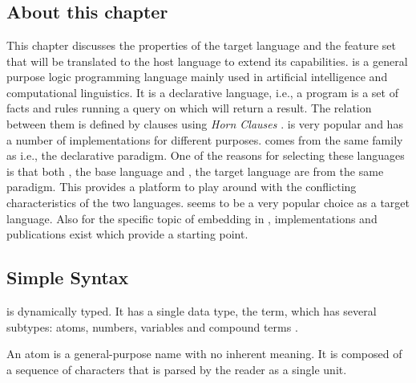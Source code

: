 \documentclass[thesis-solanki.tex]{subfiles}
\begin{document}
\chapter{}\label{chap:pwp}


\section{About this chapter}

This chapter discusses the properties of the target language  and the feature set that will be
translated to the host language to extend its capabilities.
 is a general purpose logic programming language mainly used in artificial intelligence and
computational linguistics.
It is a declarative language, i.e., a program is a set of facts and rules running a query on which will return a
result.
The relation between them is defined by clauses using \textit{Horn Clauses} \cite{wikiprolog}.
 is very popular and has a number of implementations
\cite{website:comparisonofprologimplementationswiki} for different purposes.
 comes from the same family as  i.e., the declarative paradigm.
One of the reasons for selecting these languages is that both , the base language and , the target language
are from the same paradigm.
This provides a platform to play around with the conflicting characteristics of the two languages.
 seems to be a very popular choice as a target language.
Also for the specific topic of embedding  in , implementations and publications
exist which provide a starting point.
  
\section{Simple Syntax}

 is dynamically typed.
It has a single data type, the term, which has several subtypes: atoms, numbers, variables and compound terms
\cite{wikiprolog}.


An atom is a general-purpose name with no inherent meaning.
It is composed of a sequence of characters that is parsed by the  reader as a single unit.
\end{document}
